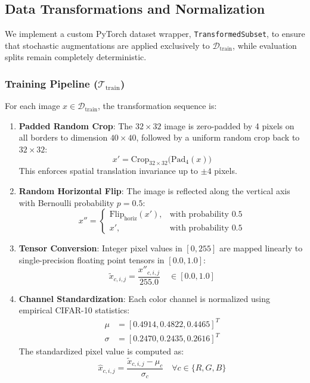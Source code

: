 \documentclass[10pt,journal,compsoc]{IEEEtran}
\begin{document}
\subsection{Data Transformations and Normalization}
We implement a custom PyTorch dataset wrapper, \texttt{TransformedSubset}, to ensure that stochastic augmentations are applied exclusively to $\mathcal{D}_{\text{train}}$, while evaluation splits remain completely deterministic.

\subsubsection{Training Pipeline ($\mathcal{T}_{\text{train}}$)}
For each image $x \in \mathcal{D}_{\text{train}}$, the transformation sequence is:
\begin{enumerate}
    \item \textbf{Padded Random Crop}: The $32 \times 32$ image is zero-padded by 4 pixels on all borders to dimension $40 \times 40$, followed by a uniform random crop back to $32 \times 32$:
    \begin{equation}
    x' = \text{Crop}_{32 \times 32}\Big(\text{Pad}_4(x)\Big)
    \end{equation}
    This enforces spatial translation invariance up to $\pm 4$ pixels.
    \item \textbf{Random Horizontal Flip}: The image is reflected along the vertical axis with Bernoulli probability $p = 0.5$:
    \begin{equation}
    x'' = \begin{cases} \text{Flip}_{\text{horiz}}(x'), & \text{with probability } 0.5 \\ x', & \text{with probability } 0.5 \end{cases}
    \end{equation}
    \item \textbf{Tensor Conversion}: Integer pixel values in $[0, 255]$ are mapped linearly to single-precision floating point tensors in $[0.0, 1.0]$:
    \begin{equation}
    \tilde{x}_{c, i, j} = \frac{x''_{c, i, j}}{255.0} \quad \in [0.0, 1.0]
    \end{equation}
    \item \textbf{Channel Standardization}: Each color channel is normalized using empirical CIFAR-10 statistics:
    \begin{align}
    \mu &= [0.4914, 0.4822, 0.4465]^T \\
    \sigma &= [0.2470, 0.2435, 0.2616]^T
    \end{align}
    The standardized pixel value is computed as:
    \begin{equation}
    \hat{x}_{c, i, j} = \frac{\tilde{x}_{c, i, j} - \mu_c}{\sigma_c} \quad \forall c \in \{R, G, B\}
    \end{equation}
\end{enumerate}
\end{document}
